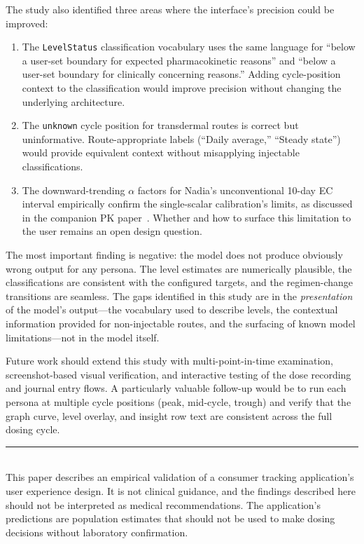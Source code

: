 \documentclass[11pt,a4paper]{article}
\newcommand{\code}[1]{\texttt{\small #1}}
\begin{document}
The study also identified three areas where the interface's precision could
be improved:

\begin{enumerate}[nosep,leftmargin=1.4em]
\item The \code{LevelStatus} classification vocabulary uses the same
  language for ``below a user-set boundary for expected pharmacokinetic
  reasons'' and ``below a user-set boundary for clinically concerning
  reasons.'' Adding cycle-position context to the classification would
  improve precision without changing the underlying architecture.
\item The \code{unknown} cycle position for transdermal routes is correct
  but uninformative. Route-appropriate labels (``Daily average,'' ``Steady
  state'') would provide equivalent context without misapplying injectable
  classifications.
\item The downward-trending $\alpha$ factors for Nadia's unconventional
  10-day EC interval empirically confirm the single-scalar calibration's
  limits, as discussed in the companion PK paper~\cite{xtpk}. Whether and
  how to surface this limitation to the user remains an open design
  question.
\end{enumerate}

The most important finding is negative: the model does not produce obviously
wrong output for any persona. The level estimates are numerically plausible,
the classifications are consistent with the configured targets, and the
regimen-change transitions are seamless. The gaps identified in this study
are in the \emph{presentation} of the model's output---the vocabulary used
to describe levels, the contextual information provided for non-injectable
routes, and the surfacing of known model limitations---not in the model
itself.

Future work should extend this study with multi-point-in-time examination,
screenshot-based visual verification, and interactive testing of the dose
recording and journal entry flows. A particularly valuable follow-up would
be to run each persona at multiple cycle positions (peak, mid-cycle, trough)
and verify that the graph curve, level overlay, and insight row text are
consistent across the full dosing cycle.

\vfill
\noindent\rule{\linewidth}{0.4pt}\\[0.3em]
{\footnotesize This paper describes an empirical validation of a consumer
tracking application's user experience design. It is not clinical guidance,
and the findings described here should not be interpreted as medical
recommendations. The application's predictions are population estimates
that should not be used to make dosing decisions without laboratory
confirmation.}
\end{document}
